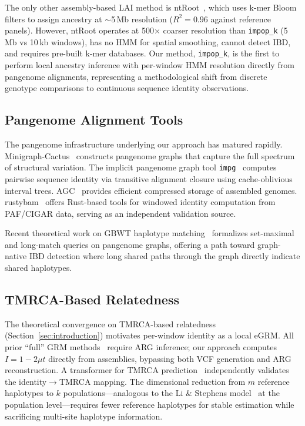 The only other assembly-based LAI method is ntRoot~\citep{ntroot2025}, which uses k-mer Bloom filters to assign ancestry at $\sim$5\,Mb resolution ($R^2 = 0.96$ against reference panels). However, ntRoot operates at 500$\times$ coarser resolution than \texttt{impop\_k} (5\,Mb vs 10\,kb windows), has no HMM for spatial smoothing, cannot detect IBD, and requires pre-built k-mer databases. Our method, \texttt{impop\_k}, is the first to perform local ancestry inference with per-window HMM resolution directly from pangenome alignments, representing a methodological shift from discrete genotype comparisons to continuous sequence identity observations.

\subsection{Pangenome Alignment Tools}

\begin{sloppypar}
The pangenome infrastructure underlying our approach has matured rapidly.
Minigraph-Cactus~\cite{hickey2024minigraph_cactus} constructs pangenome graphs that capture the full spectrum of structural variation.
The implicit pangenome graph tool \texttt{impg}~\cite{impg} computes pairwise sequence identity via transitive alignment closure using cache-oblivious interval trees.
AGC~\cite{agc} provides efficient compressed storage of assembled genomes.
rustybam~\cite{vollger2026rustybam} offers Rust-based tools for windowed identity computation from PAF/CIGAR data, serving as an independent validation source.
\end{sloppypar}

Recent theoretical work on GBWT haplotype matching~\cite{sanaullah2025gbwt} formalizes set-maximal and long-match queries on pangenome graphs, offering a path toward graph-native IBD detection where long shared paths through the graph directly indicate shared haplotypes.

\subsection{TMRCA-Based Relatedness}

The theoretical convergence on TMRCA-based relatedness (Section~\ref{sec:introduction}) motivates per-window identity as a local eGRM. All prior ``full'' GRM methods~\cite{fan2022egrm,lehmann2026branch_grm,gesi2025} require ARG inference; our approach computes $I = 1 - 2\mu t$ directly from assemblies, bypassing both VCF generation and ARG reconstruction. A transformer for TMRCA prediction~\citep{cxt2026} independently validates the identity$\to$TMRCA mapping. The dimensional reduction from $m$ reference haplotypes to $k$ populations---analogous to the Li \& Stephens model~\cite{li2003stephens} at the population level---requires fewer reference haplotypes for stable estimation while sacrificing multi-site haplotype information.
